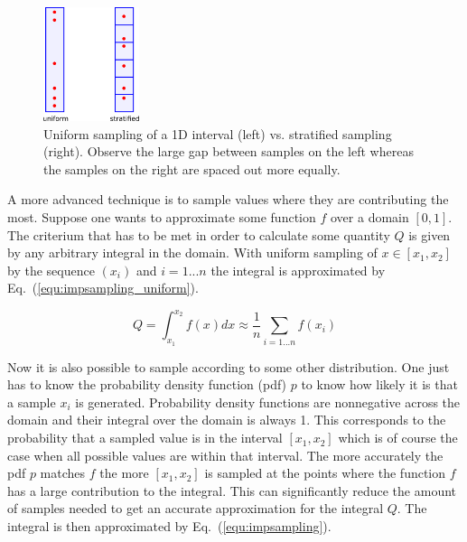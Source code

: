 \documentclass[a4paper,10pt]{article}
\newcommand{\equref}[1]{Eq.~(\ref{#1})}
\begin{document}
    \begin{center}
        \begin{figure}
            \centering    
            \includegraphics[width=0.25\textwidth]{images/stratified.png}
            \caption{
                Uniform sampling of a 1D interval (left) vs. stratified sampling (right).
                Observe the large gap between samples on the left whereas
                the samples on the right are spaced out more equally.
            }
            \label{fig:uniform_vs_stratified}
        \end{figure}
    \end{center}

    A more advanced technique is to sample values where they are contributing
    the most.
    Suppose one wants to approximate some function $f$ over a domain
    $[0,1]$.
    The criterium that has to be met in order to calculate some quantity
    $Q$ is given by any arbitrary integral in the domain.
    With uniform sampling of $x \in [x_1,x_2]$ by the sequence 
    $(x_i)$ and $i = 1...n$ the integral is approximated
    by \equref{equ:impsampling_uniform}.

    \begin{equation}
        \label{equ:impsampling_uniform}
        Q = \int_{x_1}^{x_2} f(x) dx \approx \frac{1}{n} \sum_{i = 1...n} f(x_i)
    \end{equation}

    Now it is also possible to sample according to some other distribution.
    One just has to know the probability density function (pdf) $p$ to know
    how likely it is that a sample $x_i$ is generated.
    Probability density functions are nonnegative across the domain
    and their integral over the domain is always 1.
    This corresponds to the probability that a sampled value is in the
    interval $[x_1, x_2]$ which is of course the case when all
    possible values are within that interval. 
    The more accurately the pdf $p$ matches $f$ the more $[x_1,x_2]$
    is sampled at the points where the function $f$ has a large contribution to
    the integral.
    This can significantly reduce the amount of samples needed to get an
    accurate approximation for the integral $Q$.
    The integral is then approximated by \equref{equ:impsampling}.
\end{document}
